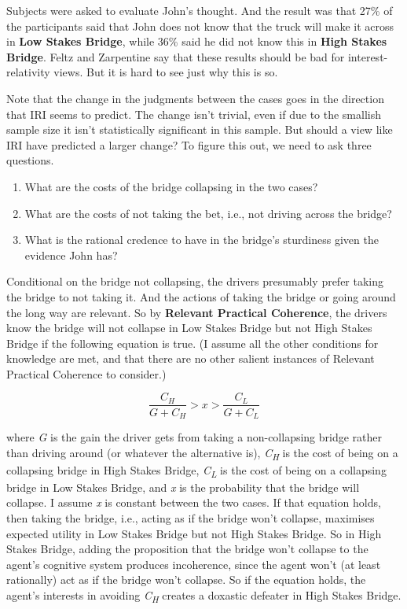 \documentclass[
  11pt,
  letterpaper,
  DIV=11,
  numbers=noendperiod,
  twoside]{scrartcl}
\providecommand{\tightlist}{%
  \setlength{\itemsep}{0pt}\setlength{\parskip}{0pt}}
\begin{document}
Subjects were asked to evaluate John's thought. And the result was that
27\% of the participants said that John does not know that the truck
will make it across in \textbf{Low Stakes Bridge}, while 36\% said he
did not know this in \textbf{High Stakes Bridge}. Feltz and Zarpentine
say that these results should be bad for interest-relativity views. But
it is hard to see just why this is so.

Note that the change in the judgments between the cases goes in the
direction that IRI seems to predict. The change isn't trivial, even if
due to the smallish sample size it isn't statistically significant in
this sample. But should a view like IRI have predicted a larger change?
To figure this out, we need to ask three questions.

\begin{enumerate}
\def\labelenumi{\arabic{enumi}.}
\tightlist
\item
  What are the costs of the bridge collapsing in the two cases?
\item
  What are the costs of not taking the bet, i.e., not driving across the
  bridge?
\item
  What is the rational credence to have in the bridge's sturdiness given
  the evidence John has?
\end{enumerate}

Conditional on the bridge not collapsing, the drivers presumably prefer
taking the bridge to not taking it. And the actions of taking the bridge
or going around the long way are relevant. So by \textbf{Relevant
Practical Coherence}, the drivers know the bridge will not collapse in
Low Stakes Bridge but not High Stakes Bridge if the following equation
is true. (I assume all the other conditions for knowledge are met, and
that there are no other salient instances of Relevant Practical
Coherence to consider.)

\[
\frac{C_H}{G + C_H} > x > \frac{C_L}{G + C_L}
\]

where \emph{G} is the gain the driver gets from taking a non-collapsing
bridge rather than driving around (or whatever the alternative is),
\emph{C\textsubscript{H}} is the cost of being on a collapsing bridge in
High Stakes Bridge, \emph{C\textsubscript{L}} is the cost of being on a
collapsing bridge in Low Stakes Bridge, and \emph{x} is the probability
that the bridge will collapse. I assume \emph{x} is constant between the
two cases. If that equation holds, then taking the bridge, i.e., acting
as if the bridge won't collapse, maximises expected utility in Low
Stakes Bridge but not High Stakes Bridge. So in High Stakes Bridge,
adding the proposition that the bridge won't collapse to the agent's
cognitive system produces incoherence, since the agent won't (at least
rationally) act as if the bridge won't collapse. So if the equation
holds, the agent's interests in avoiding \emph{C\textsubscript{H}}
creates a doxastic defeater in High Stakes Bridge.
\end{document}
